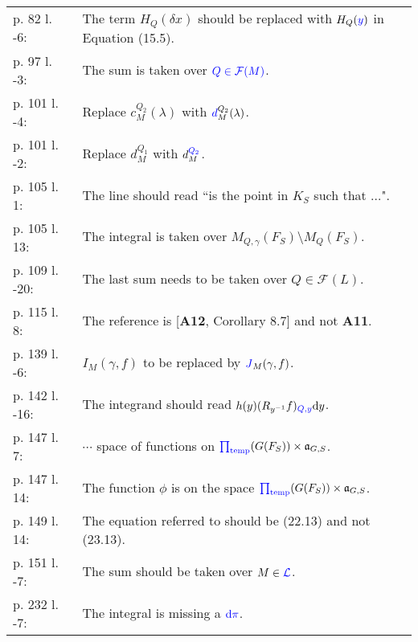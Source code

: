 \documentclass[11pt]{amsart}
\def\FFF{\mathcal F}
\def\LLL{\mathcal L}
\def\aaa{\mathfrak a}
\def\cb#1{{\color{blue}#1}}
\def\d{\text d}
\def\bs{\setminus} 			%
\theoremstyle{remark}
\begin{document}
\begin{longtable} {ll}
	p. 82 l. -6: & The term $H_Q(\delta x)$ should be replaced with $H_Q(\cb{y})$ in Equation (15.5). \\[0.5em]
	p. 97 l. -3: & The sum is taken over $\cb{Q \in \FFF(M)}$. \\[0.5em]
	p. 101 l. -4: & Replace $c_M^{Q_2}(\lambda)$ with $\cb{d}_M^{Q_2}(\lambda)$. \\[0.5em]
	p. 101 l. -2: & Replace $d_M^{Q_1}$ with $d_M^{\cb{Q_2}}$. \\[0.5em]
	p. 105 l. 1: & The line should read ``is the point \cb{in} $K_S$ such that $\dots$". \\[0.5em]
	p. 105 l. 13: & The integral is taken over $M_{Q, \gamma}(F_S)\bs M_Q(F_S)$. \\[0.5em]
	p. 109 l. -20: & The last sum needs to be taken over $Q \in \FFF(L)$. \\[0.5em]
	p. 115 l. 8: & The reference is [\textbf{\cb{A12}}, Corollary 8.7] and not \textbf{A11}. \\[0.5em]
	p. 139 l. -6: & $I_M(\gamma, f)$ to be replaced by $\cb{J}_M(\gamma, f)$. \\[0.5em]
	p. 142 l. -16: & The integrand should read $h(y) (R_{y^{-1}}f)_{\cb{Q, y}} \d y$. \\[0.5em]
	p. 147 l. 7: & $\cdots$ space of functions on $\cb{\prod_{\text{temp}}}(G(F_S))\times \aaa_{G, S}$. \\[0.5em]
	p. 147 l. 14: & The function $\phi$ is on the space $\cb{\prod_{\text{temp}}}(G(F_S))\times \aaa_{G, S}$. \\[0.5em]
	p. 149 l. 14: & The equation referred to should be (\cb{22.13}) and not (23.13). \\[0.5em]
	p. 151 l. -7: & The sum should be taken over $M \in \cb{\LLL}$. \\[0.5em]
	p. 232 l. -7: & The integral is missing a $\cb{\d \pi}$. \\[1em]
	
\end{longtable}
\end{document}
